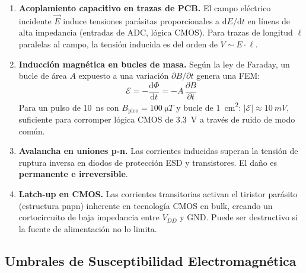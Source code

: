 \documentclass[12pt,a4paper]{article}
\begin{document}
\begin{enumerate}[label=\textbf{\arabic*.}, leftmargin=*, itemsep=4pt]
  \item \textbf{Acoplamiento capacitivo en trazas de PCB.}
        El campo eléctrico incidente $\vec{E}$ induce tensiones parásitas
        proporcionales a $\mathrm{d}E/\mathrm{d}t$ en líneas de alta impedancia
        (entradas de ADC, lógica CMOS). Para trazas de longitud $\ell$ paralelas
        al campo, la tensión inducida es del orden de $V \sim E \cdot \ell$.

  \item \textbf{Inducción magnética en bucles de masa.}
        Según la ley de Faraday, un bucle de área $A$ expuesto a una variación
        $\partial B/\partial t$ genera una FEM:
        \[
          \mathcal{E} = -\frac{\mathrm{d}\Phi}{\mathrm{d}t}
                       = -A\,\frac{\partial B}{\partial t}
        \]
        Para un pulso de \SI{10}{ns} con $B_\mathrm{pico} = \SI{100}{\micro T}$
        y bucle de \SI{1}{cm^2}: $|\mathcal{E}| \approx \SI{10}{mV}$, suficiente
        para corromper lógica CMOS de \SI{3.3}{V} a través de ruido de modo común.

  \item \textbf{Avalancha en uniones p-n.}
        Las corrientes inducidas superan la tensión de ruptura inversa en diodos
        de protección ESD y transistores. El daño es \textbf{permanente e irreversible}.

  \item \textbf{Latch-up en CMOS.}
        Las corrientes transitorias activan el tiristor parásito (estructura pnpn)
        inherente en tecnología CMOS en bulk, creando un cortocircuito de
        baja impedancia entre $V_{DD}$ y GND. Puede ser destructivo si la
        fuente de alimentación no lo limita.
\end{enumerate}

\subsection{Umbrales de Susceptibilidad Electromagnética}
\end{document}

